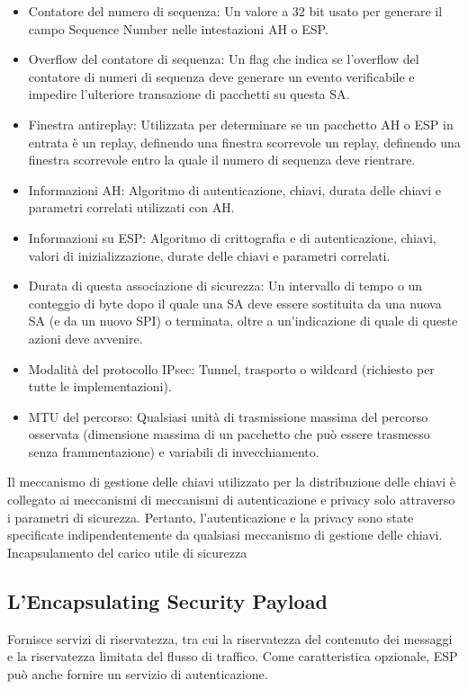 \begin{itemize}
    \item Contatore del numero di sequenza: Un valore a 32 bit usato per generare il campo Sequence Number nelle intestazioni AH o ESP.
    
    \item Overflow del contatore di sequenza: Un flag che indica se l'overflow del contatore di numeri di sequenza deve generare un evento verificabile e impedire l'ulteriore transazione di pacchetti su questa SA.
    
    \item Finestra antireplay: Utilizzata per determinare se un pacchetto AH o ESP in entrata è un replay, definendo una finestra scorrevole un replay, definendo una finestra scorrevole entro la quale il numero di sequenza deve rientrare.
    
    \item Informazioni AH: Algoritmo di autenticazione, chiavi, durata delle chiavi e parametri correlati utilizzati con AH.
    
    \item Informazioni su ESP: Algoritmo di crittografia e di autenticazione, chiavi, valori di inizializzazione, durate delle chiavi e parametri correlati.
    
    \item Durata di questa associazione di sicurezza: Un intervallo di tempo o un conteggio di byte dopo il quale una SA deve essere sostituita da una nuova SA (e da un nuovo SPI) o terminata, oltre a un'indicazione di quale di queste azioni deve avvenire.
    
    \item Modalità del protocollo IPsec: Tunnel, trasporto o wildcard (richiesto per tutte le implementazioni).
    
    \item MTU del percorso: Qualsiasi unità di trasmissione massima del percorso osservata (dimensione massima di un pacchetto che può essere trasmesso senza frammentazione) e variabili di invecchiamento.
\end{itemize}
Il meccanismo di gestione delle chiavi utilizzato per la distribuzione delle chiavi è collegato ai meccanismi di
meccanismi di autenticazione e privacy solo attraverso i parametri di sicurezza. Pertanto, l'autenticazione e la privacy sono state specificate indipendentemente da qualsiasi meccanismo di gestione delle chiavi.
Incapsulamento del carico utile di sicurezza
\subsection{L'Encapsulating Security Payload}
Fornisce servizi di riservatezza, tra cui la riservatezza del contenuto dei messaggi e la riservatezza limitata del flusso di traffico. Come caratteristica opzionale, ESP può anche fornire un servizio di autenticazione. 

